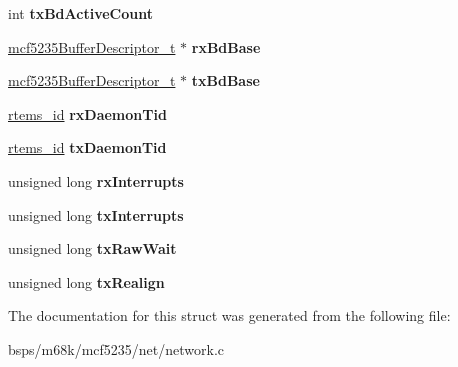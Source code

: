 \begin{DoxyCompactItemize}
int {\bfseries tx\+Bd\+Active\+Count}
\item 
\mbox{\label{structmcf5235__enet__struct_a3ef6df478f50cbd1931605848c928d34}} 
\mbox{\hyperlink{structmcf5235BufferDescriptor__}{mcf5235\+Buffer\+Descriptor\+\_\+t}} $\ast$ {\bfseries rx\+Bd\+Base}
\item 
\mbox{\label{structmcf5235__enet__struct_a5b289321966467b73195c592c22a6949}} 
\mbox{\hyperlink{structmcf5235BufferDescriptor__}{mcf5235\+Buffer\+Descriptor\+\_\+t}} $\ast$ {\bfseries tx\+Bd\+Base}
\item 
\mbox{\label{structmcf5235__enet__struct_a841ae8f5634347d553dd2458d35cab63}} 
\mbox{\hyperlink{group__ClassicTasks_gab20892b814dced7dd4e5b9bf42becd57}{rtems\+\_\+id}} {\bfseries rx\+Daemon\+Tid}
\item 
\mbox{\label{structmcf5235__enet__struct_add8ca372d5f3ccc190b9e3b2cab2e61e}} 
\mbox{\hyperlink{group__ClassicTasks_gab20892b814dced7dd4e5b9bf42becd57}{rtems\+\_\+id}} {\bfseries tx\+Daemon\+Tid}
\item 
\mbox{\label{structmcf5235__enet__struct_a59de27f63f7d77dc35510ba19c094265}} 
unsigned long {\bfseries rx\+Interrupts}
\item 
\mbox{\label{structmcf5235__enet__struct_a5115a9fbe032f69575db07a050be22c8}} 
unsigned long {\bfseries tx\+Interrupts}
\item 
\mbox{\label{structmcf5235__enet__struct_a04246e1541be18f3dce48104e03f3418}} 
unsigned long {\bfseries tx\+Raw\+Wait}
\item 
\mbox{\label{structmcf5235__enet__struct_a796d568983e74b761e4e70acf326d557}} 
unsigned long {\bfseries tx\+Realign}
\end{DoxyCompactItemize}


The documentation for this struct was generated from the following file\+:\begin{DoxyCompactItemize}
\item 
bsps/m68k/mcf5235/net/network.\+c\end{DoxyCompactItemize}

